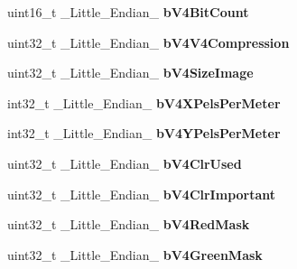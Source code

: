\begin{DoxyCompactItemize}
\item 
\hypertarget{structGCC__ATTRIBUTE_ac5d534ed26a936f4d92ddff87858a733}{uint16\-\_\-t \-\_\-\-Little\-\_\-\-Endian\-\_\- {\bfseries b\-V4\-Bit\-Count}}\label{structGCC__ATTRIBUTE_ac5d534ed26a936f4d92ddff87858a733}

\item 
\hypertarget{structGCC__ATTRIBUTE_ad5b6bbe933be97bf3872de5c5b0daf4a}{uint32\-\_\-t \-\_\-\-Little\-\_\-\-Endian\-\_\- {\bfseries b\-V4\-V4\-Compression}}\label{structGCC__ATTRIBUTE_ad5b6bbe933be97bf3872de5c5b0daf4a}

\item 
\hypertarget{structGCC__ATTRIBUTE_abc54f30bd4fba2004707c2b1d9f76273}{uint32\-\_\-t \-\_\-\-Little\-\_\-\-Endian\-\_\- {\bfseries b\-V4\-Size\-Image}}\label{structGCC__ATTRIBUTE_abc54f30bd4fba2004707c2b1d9f76273}

\item 
\hypertarget{structGCC__ATTRIBUTE_ab1b07ec82804cf1caac609db1baa4af3}{int32\-\_\-t \-\_\-\-Little\-\_\-\-Endian\-\_\- {\bfseries b\-V4\-X\-Pels\-Per\-Meter}}\label{structGCC__ATTRIBUTE_ab1b07ec82804cf1caac609db1baa4af3}

\item 
\hypertarget{structGCC__ATTRIBUTE_a0d95c956b3286135bba98985a67ae213}{int32\-\_\-t \-\_\-\-Little\-\_\-\-Endian\-\_\- {\bfseries b\-V4\-Y\-Pels\-Per\-Meter}}\label{structGCC__ATTRIBUTE_a0d95c956b3286135bba98985a67ae213}

\item 
\hypertarget{structGCC__ATTRIBUTE_a836235e5c9e89421d728b3699d15a75b}{uint32\-\_\-t \-\_\-\-Little\-\_\-\-Endian\-\_\- {\bfseries b\-V4\-Clr\-Used}}\label{structGCC__ATTRIBUTE_a836235e5c9e89421d728b3699d15a75b}

\item 
\hypertarget{structGCC__ATTRIBUTE_a0b519968162746ea16f9e52dcc545946}{uint32\-\_\-t \-\_\-\-Little\-\_\-\-Endian\-\_\- {\bfseries b\-V4\-Clr\-Important}}\label{structGCC__ATTRIBUTE_a0b519968162746ea16f9e52dcc545946}

\item 
\hypertarget{structGCC__ATTRIBUTE_a45c815171643594a0cfcf7b8bc694eff}{uint32\-\_\-t \-\_\-\-Little\-\_\-\-Endian\-\_\- {\bfseries b\-V4\-Red\-Mask}}\label{structGCC__ATTRIBUTE_a45c815171643594a0cfcf7b8bc694eff}

\item 
\hypertarget{structGCC__ATTRIBUTE_a732d3b2e85315d3c292e44bc5a5fd643}{uint32\-\_\-t \-\_\-\-Little\-\_\-\-Endian\-\_\- {\bfseries b\-V4\-Green\-Mask}}\label{structGCC__ATTRIBUTE_a732d3b2e85315d3c292e44bc5a5fd643}


\end{DoxyCompactItemize}
